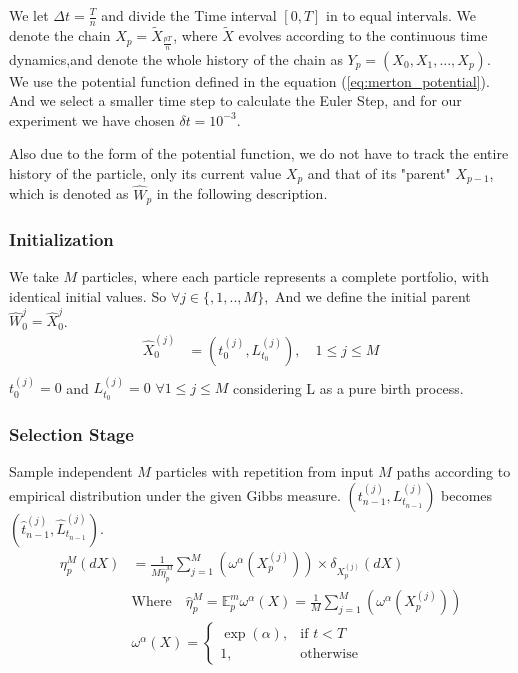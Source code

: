 We let $\Delta t = \frac{T}{n}$ and divide the Time interval $[0,T]$ in to equal 
intervals. We denote the chain $X_p = \tilde{X}_{\frac{pT}{n}}$, where $\tilde{X}$ 
evolves according to the continuous time dynamics,and denote the whole history of 
the chain as $Y_{p} =(X_{0},X_{1},...,X_{p})$. We use the potential function 
defined in the equation (\ref{eq:merton_potential}). And we select a smaller 
time step to calculate the Euler Step, and for our experiment we have chosen 
$\delta t = 10^{-3}$.

Also due to the form of the potential function, we do not have to track the 
entire history of the particle, only its current value $X_p$ and that of its 
"parent" $X_{p-1}$, which is denoted as $\hat{W}_p$ in the following description.

\subsubsection{Initialization}
We take $M$ particles, where each particle represents a complete portfolio, 
with identical initial values. So $\forall j \in \{,1,..,M\},$
And we define the initial parent $\hat{W}_0^{j}=\hat{X}_0^{j}$.
\begin{equation*}
			\begin{split}
				\hat{X}_0^{(j)} &= \left( t_{0}^{(j)},L_{t_0}^{(j)} \right),  \quad 
				 1 \leq j\leq M                                                                    \\
			\end{split}
\end{equation*}
$ t_{0}^{(j)} = 0$ and $ L_{t_{0}}^{(j)} = 0$ $\forall 1 \leq j\leq M $ considering L as a pure birth process.


\subsubsection{Selection Stage}
Sample independent $M$ particles with repetition from input $M$ paths according to empirical distribution under the given Gibbs measure.
$\left(t^{(j)}_{n-1}, L_{t_{n-1}}^{(j)} \right)$ becomes $\left( \hat{t}_{n-1}^{(j)}, \hat{L}_{t_{n-1}}^{(j)}\right)$.
		\begin{equation*}
			\begin{split}
				\eta_{p}^{M}(dX) &= \frac{1}{M \hat{\eta}_{p}^{M}}\sum_{j=1}^{M}\left(\omega^{\alpha}(X_{p}^{(j)})\right) \times \delta_{{X}_p^{(j)}}(dX) \\
				&\text{Where} \quad
				\hat{\eta}_{p}^{M} = \mathbb{E}_{p}^{m}\omega^{\alpha}(X) =
				\frac{1}{M}\sum_{j=1}^{M}\left(\omega^{\alpha}(X_{p}^{(j)})\right)\\
				&\omega^{\alpha}(X)= 
                		\begin{cases}
    						\exp(\alpha),& \text{if } t < T\\
    						1,              & \text{otherwise}
						 \end{cases}
		    \end{split}
		\end{equation*}

